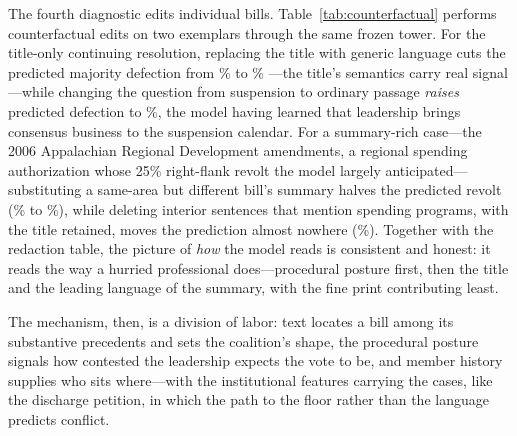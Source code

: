 \documentclass[12pt]{article}
\begin{document}
The fourth diagnostic edits individual bills.
Table~\ref{tab:counterfactual} performs counterfactual edits on two
exemplars through the same frozen tower. For the title-only
continuing resolution, replacing the title with generic language cuts
the predicted majority defection from \cfAraOrig\% to \cfAraGeneric\%
---the title's semantics carry real signal---while changing the
question from suspension to ordinary passage \emph{raises} predicted
defection to \cfAraPassage\%, the model having learned that
leadership brings consensus business to the suspension calendar. For
a summary-rich case---the 2006 Appalachian Regional Development
amendments, a regional spending authorization whose 25\% right-flank
revolt the model largely anticipated---substituting a same-area but
different bill's summary halves the predicted revolt
(\cfArdaOrig\% to \cfArdaSwap\%), while deleting interior sentences
that mention spending programs, with the title retained, moves the
prediction almost nowhere (\cfArdaCut\%). Together with the
redaction table, the picture of \emph{how} the model reads is
consistent and honest: it reads the way a hurried professional
does---procedural posture first, then the title and the leading
language of the summary, with the fine print contributing least.

\begin{table}[t]
\centering
\caption{Counterfactual text edits on two exemplar holdout votes. Each
row feeds the frozen model a different version of one bill's text,
holding every non-text feature at its actual value, and reports the
predicted majority-party revolt: the mean predicted defection
probability among majority members, the implied number of defectors,
and how many of the model's five likeliest defectors in fact voted
nay. Comparing rows within a panel shows which part of the text moves
the prediction.}
\label{tab:counterfactual}
{\small }
\end{table}

The mechanism, then, is a division of labor: text locates a bill
among its substantive precedents and sets the coalition's shape, the
procedural posture signals how contested the leadership expects the
vote to be, and member history supplies who sits where---with the
institutional features carrying the cases, like the discharge
petition, in which the path to the floor rather than the language
predicts conflict.

\begin{table}[t]
\centering
\caption{What the encoder considers similar. For three held-out votes
of the 118th Congress (headers), the three most textually similar
earlier bills from the model's training window, with each neighbor's
realized majority-party defection share. When a bill's nearest
neighbors are bills that provoked revolts, the model has, in effect,
seen this situation before; the Social Security Fairness Act panel
shows the failure mode, discussed in the text.}
\label{tab:neighbors}
{\small }
\end{table}
\end{document}
